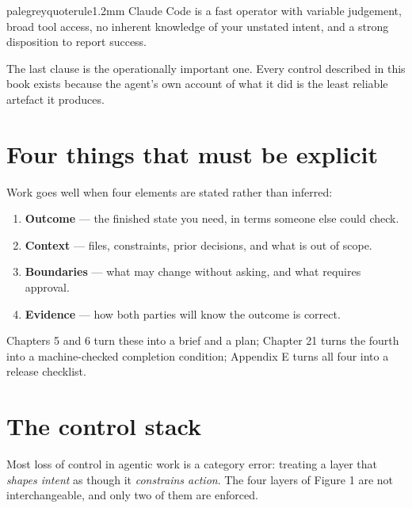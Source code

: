 \documentclass[11pt,a4paper,twoside,openany]{book}
\begin{document}
\begin{calloutbox}{palegrey}{quoterule}{1.2mm}
Claude Code is a fast operator with variable judgement, broad tool access, no inherent knowledge of your unstated intent, and a strong disposition to report success.
\end{calloutbox}

The last clause is the operationally important one. Every control described in this book exists because the agent's own account of what it did is the least reliable artefact it produces.


\FloatBarrier
\setcounter{section}{0}
\section{Four things that must be explicit}

Work goes well when four elements are stated rather than inferred:


\begin{enumerate}
\item \textbf{Outcome} — the finished state you need, in terms someone else could check.
\item \textbf{Context} — files, constraints, prior decisions, and what is out of scope.
\item \textbf{Boundaries} — what may change without asking, and what requires approval.
\item \textbf{Evidence} — how both parties will know the outcome is correct.
\end{enumerate}

Chapters 5 and 6 turn these into a brief and a plan; Chapter 21 turns the fourth into a machine-checked completion condition; Appendix E turns all four into a release checklist.


\FloatBarrier
\setcounter{section}{1}
\section{The control stack}

Most loss of control in agentic work is a category error: treating a layer that \emph{shapes intent} as though it \emph{constrains action}. The four layers of Figure 1 are not interchangeable, and only two of them are enforced.
\end{document}
